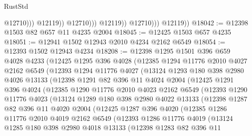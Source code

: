 \begin{lexlean}{RustStd}
\begin{coremodule}
                                  @12710)))
                            @12119))
                        @12710)))
                  @12119))
              @12710)))
        @12119))
@18042 := @12398 @1503 @82 @657 @11 @4235 @2004
@18045 := @12425 @1503 @657 @4235
@18051 := @12941 @1502 @12943 @2010 @4234 @2162 @6549
@18054 := @12393 @1502 @12943 @4234
@18208 := @12398
    @1295
    @1501
    @396
    @659
    @4028
    @4233
    (@12425
      @1295
      @396
      @4028
      (@12385
        @1294
        @11776
        @2010
        @4027
        @2162
        @6549
        (@12393
          @1294
          @11776
          @4027
          (@13124
            @1293
            @180
            @398
            @2980
            @4026
            @13133
            (@12398
              @1291
              @82
              @396
              @11
              @4024
              @2004
              (@12425
                @1291
                @396
                @4024
                (@12385
                  @1290
                  @11776
                  @2010
                  @4023
                  @2162
                  @6549
                  (@12393
                    @1290
                    @11776
                    @4023
                    (@13124
                      @1289
                      @180
                      @398
                      @2980
                      @4022
                      @13133
                      (@12398
                        @1287
                        @82
                        @396
                        @11
                        @4020
                        @2004
                        (@12425
                          @1287
                          @396
                          @4020
                          (@12385
                            @1286
                            @11776
                            @2010
                            @4019
                            @2162
                            @6549
                            (@12393
                              @1286
                              @11776
                              @4019
                              (@13124
                                @1285
                                @180
                                @398
                                @2980
                                @4018
                                @13133
                                (@12398
                                  @1283
                                  @82
                                  @396
                                  @11

\end{coremodule}
\end{lexlean}
